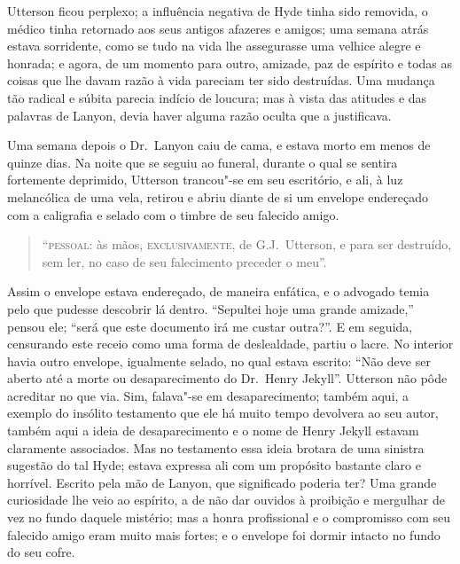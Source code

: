 Utterson ficou perplexo; a influência negativa de Hyde tinha sido
removida, o médico tinha retornado aos seus antigos afazeres e amigos;
uma semana atrás estava sorridente, como se tudo na vida lhe
assegurasse uma velhice alegre e honrada; e agora, de um momento para
outro, amizade, paz de espírito e todas as coisas que lhe davam razão à
vida pareciam ter sido destruídas.  Uma mudança tão radical e súbita
parecia indício de loucura; mas à vista das atitudes e das palavras de
Lanyon, devia haver alguma razão oculta que a justificava.

Uma semana depois o Dr.~Lanyon caiu de cama, e estava morto em menos de
quinze dias.  Na noite que se seguiu ao funeral, durante o qual se
sentira fortemente deprimido, Utterson trancou"-se em seu
escritório, e ali, à luz melancólica de uma vela, retirou e abriu
diante de si um envelope endereçado com a caligrafia e selado com o
timbre de seu falecido amigo.  

\begin{quote}
“\textsc{pessoal}: às mãos, \textsc{exclusivamente}, de G.J.~Utterson, e para ser
destruído, sem ler, no caso de seu falecimento preceder o meu”.
\end{quote}

Assim o envelope estava endereçado, de maneira enfática, e o advogado
temia pelo que pudesse descobrir lá dentro.  “Sepultei hoje uma grande
amizade,” pensou ele; “será que este documento irá me custar outra?”. 
E em seguida, censurando este receio como uma forma de deslealdade, 
partiu o lacre.  No interior havia outro envelope, igualmente selado,
no qual estava escrito: “Não deve ser aberto até a morte ou
desaparecimento do Dr.~Henry Jekyll”.  Utterson não pôde acreditar no
que via.  Sim, falava"-se em desaparecimento; também aqui, a exemplo do
insólito testamento que ele há muito tempo devolvera ao seu autor,
também aqui a ideia de desaparecimento e o nome de Henry Jekyll estavam
claramente associados.  Mas no testamento essa ideia brotara de uma
sinistra sugestão do tal Hyde; estava expressa ali com um propósito
bastante claro e horrível.  Escrito pela mão de Lanyon, que significado
poderia ter?  Uma grande curiosidade lhe veio ao espírito, a de não dar
ouvidos à proibição e mergulhar de vez no fundo daquele mistério; mas a
honra profissional e o compromisso com seu falecido amigo eram
muito mais fortes; e o envelope foi dormir intacto no
fundo do seu cofre.

